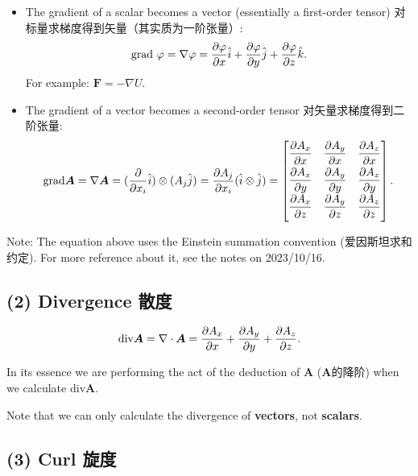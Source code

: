 \begin{itemize}
\tightlist{}
\item
  The gradient of a scalar becomes a vector (essentially a first-order tensor) 对标量求梯度得到矢量（其实质为一阶张量）:  \[\mathrm{grad} \ \varphi = \nabla \varphi = {\partial \varphi \over \partial x}\hat i + {\partial \varphi \over \partial y}\hat j + {\partial \varphi \over \partial z}\hat k.\]
  For example: \(\boldsymbol F = - \nabla U\).
\item
    The gradient of a vector becomes a second-order tensor 对矢量求梯度得到二阶张量:
    \[\mathrm{grad} \boldsymbol A = \nabla \boldsymbol A = ({\partial \over \partial x_i}\hat i) \otimes (A_j \hat j) = {\partial A_j \over \partial x_i} (\hat i \otimes \hat j) = \begin{bmatrix}
        \dfrac{\partial A_x}{\partial x} & \dfrac{\partial A_y}{\partial x} & \dfrac{\partial A_z}{\partial x} \\[1.5ex]
        \dfrac{\partial A_x}{\partial y} & \dfrac{\partial A_y}{\partial y} & \dfrac{\partial A_z}{\partial y} \\[1.5ex]
        \dfrac{\partial A_x}{\partial z} & \dfrac{\partial A_y}{\partial z} & \dfrac{\partial A_z}{\partial z} \\[1.5ex]
    \end{bmatrix}.\]
\end{itemize}

Note: The equation above uses the Einstein summation convention (爱因斯坦求和约定). For more reference about it, see the notes on 2023/10/16.

\subsection*{(2) Divergence 散度}\label{divergence-ux6563ux5ea6}

\[\mathrm{div} \boldsymbol A = \nabla \cdot \boldsymbol A = {\partial A_x \over \partial x} + {\partial A_y \over \partial y} + {\partial A_z \over \partial z}.\]

In its essence we are performing the act of the deduction of \(\boldsymbol A\) (\(\boldsymbol A\)的降阶) when we calculate
\(\mathrm{div} \boldsymbol A\).

Note that we can only calculate the divergence of \textbf{vectors}, not \textbf{scalars}.

\subsection*{(3) Curl 旋度}\label{curl-ux65cbux5ea6}

